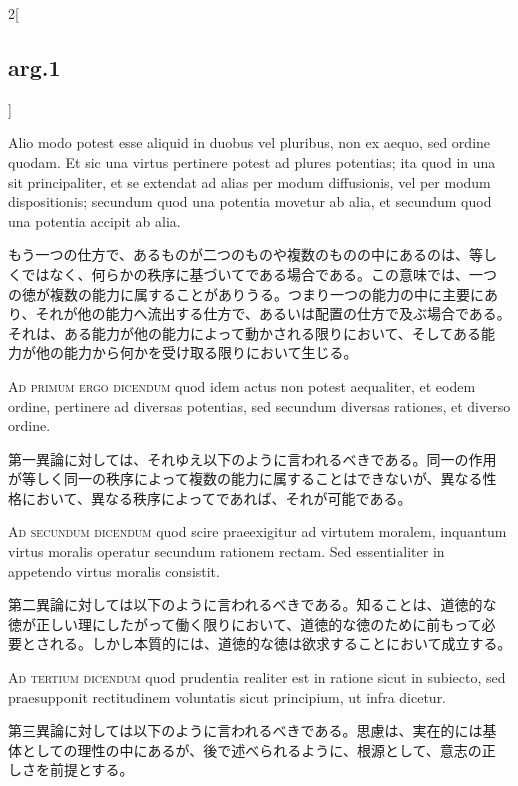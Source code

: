 \documentclass[paper=a4paper,fontsize=10pt,jafontsize=9pt,titlepage]{jlreq}
\begin{document}
\begin{paracol}{2}[\subsection{arg.1}]
\switchcolumn*

Alio modo potest esse aliquid in duobus vel pluribus, non ex aequo,
sed ordine quodam. Et sic una virtus pertinere potest ad plures
potentias; ita quod in una sit principaliter, et se extendat ad alias
per modum diffusionis, vel per modum dispositionis; secundum quod una
potentia movetur ab alia, et secundum quod una potentia accipit ab
alia.

\switchcolumn

もう一つの仕方で、あるものが二つのものや複数のものの中にあるのは、等し
くではなく、何らかの秩序に基づいてである場合である。この意味では、一つ
の徳が複数の能力に属することがありうる。つまり一つの能力の中に主要にあ
り、それが他の能力へ流出する仕方で、あるいは配置の仕方で及ぶ場合である。
それは、ある能力が他の能力によって動かされる限りにおいて、そしてある能
力が他の能力から何かを受け取る限りにおいて生じる。

\switchcolumn*[\subsection{ad.1}]

{\scshape Ad primum ergo dicendum} quod idem actus non potest
aequaliter, et eodem ordine, pertinere ad diversas potentias, sed
secundum diversas rationes, et diverso ordine.

\switchcolumn

第一異論に対しては、それゆえ以下のように言われるべきである。同一の作用
が等しく同一の秩序によって複数の能力に属することはできないが、異なる性
格において、異なる秩序によってであれば、それが可能である。

\switchcolumn*[\subsection{ad.2}]

{\scshape Ad secundum dicendum} quod scire praeexigitur ad virtutem
moralem, inquantum virtus moralis operatur secundum rationem
rectam. Sed essentialiter in appetendo virtus moralis consistit.

\switchcolumn

第二異論に対しては以下のように言われるべきである。知ることは、道徳的な
徳が正しい理にしたがって働く限りにおいて、道徳的な徳のために前もって必
要とされる。しかし本質的には、道徳的な徳は欲求することにおいて成立する。

\switchcolumn*[\subsection{ad.3}]

{\scshape Ad tertium dicendum} quod prudentia realiter est in ratione
sicut in subiecto, sed praesupponit rectitudinem voluntatis sicut
principium, ut infra dicetur.

\switchcolumn

第三異論に対しては以下のように言われるべきである。思慮は、実在的には基
体としての理性の中にあるが、後で述べられるように、根源として、意志の正
しさを前提とする。

\end{paracol}
\end{document}
